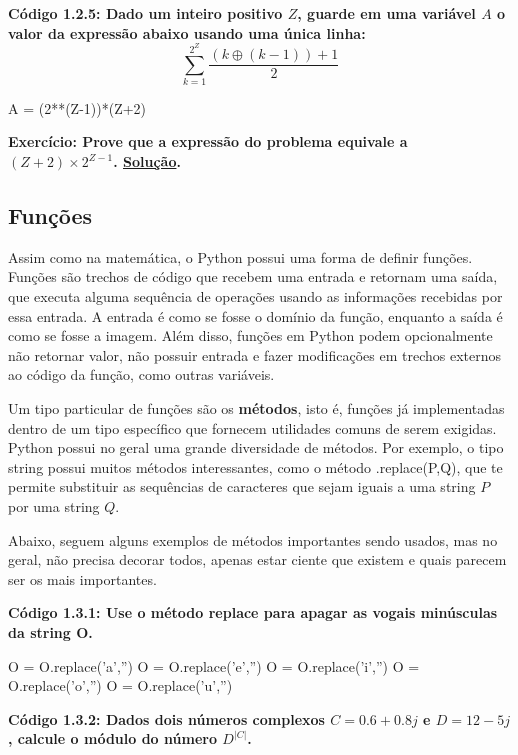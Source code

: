 \documentclass[11pt, a4paper]{article}
\begin{document}
\textbf{Código 1.2.5: Dado um inteiro positivo \(Z\), guarde em uma variável \(A\) o valor da expressão abaixo usando uma única linha:}
\[\sum_{k=1}^{2^Z}{\frac{(k\oplus(k-1))+1}{2}}\]

\begin{code}
A = (2**(Z-1))*(Z+2)
\end{code}

\label{c1.2.5}

\textbf{Exercício: Prove que a expressão do problema equivale a \((Z+2)\times2^{Z-1}\). \hyperref[sol_c1.2.5]{Solução}.}

\subsection{Funções}

Assim como na matemática, o Python possui uma forma de definir funções. Funções são trechos de código que recebem uma entrada e retornam uma saída, que executa alguma sequência de operações usando as informações recebidas por essa entrada. A entrada é como se fosse o domínio da função, enquanto a saída é como se fosse a imagem. Além disso, funções em Python podem opcionalmente não retornar valor, não possuir entrada e fazer modificações em trechos externos ao código da função, como outras variáveis.

Um tipo particular de funções são os \textbf{métodos}, isto é, funções já implementadas dentro de um tipo específico que fornecem utilidades comuns de serem exigidas. Python possui no geral uma grande diversidade de métodos. Por exemplo, o tipo string possui muitos métodos interessantes, como o método .replace(P,Q), que te permite substituir as sequências de caracteres que sejam iguais a uma string \(P\) por uma string \(Q\).

Abaixo, seguem alguns exemplos de métodos importantes sendo usados, mas no geral, não precisa decorar todos, apenas estar ciente que existem e quais parecem ser os mais importantes.

\textbf{Código 1.3.1: Use o método replace para apagar as vogais minúsculas da string O.}

\begin{code}
O = O.replace('a','')
O = O.replace('e','')
O = O.replace('i','')
O = O.replace('o','')
O = O.replace('u','')
\end{code}

\textbf{Código 1.3.2: Dados dois números complexos \(C=0.6+0.8j\) e \(D=12-5j\), calcule o módulo do número \(D^{|C|}\).}
\end{document}
